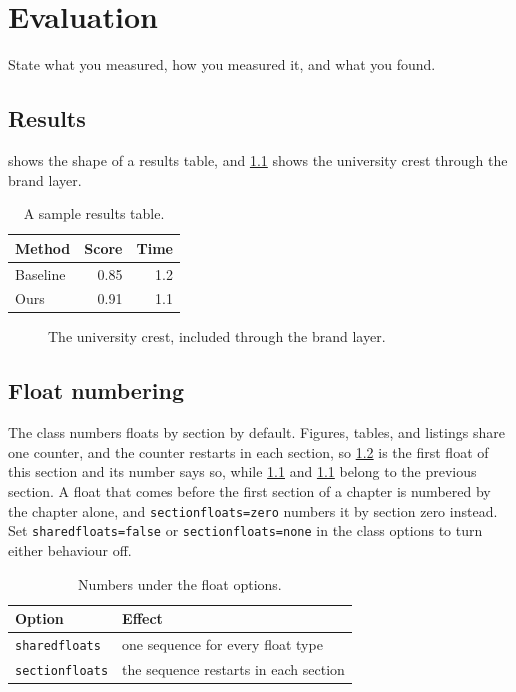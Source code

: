 \chapter{Evaluation}
State what you measured, how you measured it, and what you found.

\section{Results}
 shows the shape of a results table, and \cref{fig:crest} shows the university crest through the brand layer.

\begin{table}[htbp]
  \centering
  \caption{A sample results table.}
  \label{tab:sample}
  \begin{tabular}{lrr}
    \hline
    Method & Score & Time \\
    \hline
    Baseline & 0.85 & 1.2 \\
    Ours & 0.91 & 1.1 \\
    \hline
  \end{tabular}
\end{table}

\begin{figure}[htbp]
  \centering
  \bangorcrest[4cm]
  \caption{The university crest, included through the brand layer.}
  \label{fig:crest}
\end{figure}

\section{Float numbering}
The class numbers floats by section by default. Figures, tables, and listings share one counter, and the counter restarts in each section, so \cref{tab:numbering} is the first float of this section and its number says so, while \cref{tab:sample} and \cref{fig:crest} belong to the previous section. A float that comes before the first section of a chapter is numbered by the chapter alone, and \texttt{sectionfloats=zero} numbers it by section zero instead. Set \texttt{sharedfloats=false} or \texttt{sectionfloats=none} in the class options to turn either behaviour off.

\begin{table}[htbp]
  \centering
  \caption{Numbers under the float options.}
  \label{tab:numbering}
  \begin{tabular}{ll}
    \hline
    Option & Effect \\
    \hline
    \texttt{sharedfloats} & one sequence for every float type \\
    \texttt{sectionfloats} & the sequence restarts in each section \\
    \hline
  \end{tabular}
\end{table}

